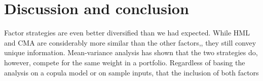 
\section{Discussion and conclusion} %
\label{sec:discussion_conclusion}

Factor strategies are even better diversified than we had expected. While HML and CMA are considerably more similar than the other factors,, they still convey unique information. Mean-variance analysis has shown that the two strategies do, however, compete for the same weight in a portfolio. Regardless of basing the analysis on a copula model or on sample inputs, that the inclusion of both factors  